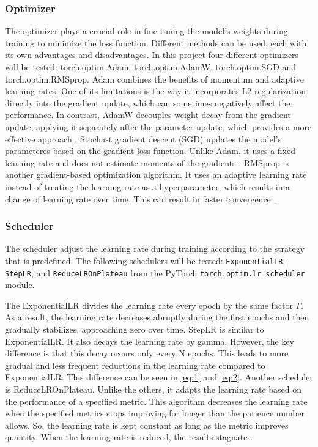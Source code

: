 \documentclass[twocolumn]{article}
\begin{document}
\subsubsection{Optimizer}
The optimizer plays a crucial role in fine-tuning the model's weights during training to minimize the loss function. 
Different methods can be used, each with its own advantages and disadvantages. 
In this project four different optimizers will be tested: torch.optim.Adam, torch.optim.AdamW, torch.optim.SGD and torch.optim.RMSprop. 
Adam combines the benefits of momentum and adaptive learning rates.  
One of its limitations is the way it incorporates L2 regularization directly into the gradient update, which can sometimes negatively affect the performance. 
In contrast, AdamW decouples weight decay from the gradient update, applying it separately after the parameter update, which provides a more effective approach \cite{pykes-2021}.
Stochast gradient descent (SGD) updates the model's parameteres based on the gradient loss function. 
Unlike Adam, it uses a fixed learning rate and does not estimate moments of the gradients \cite{massed-compute-2025}.
RMSprop is another gradient-based optimization algorithm. 
It uses an adaptive learning rate instead of treating the learning rate as a hyperparameter, which results in a change of learning rate over time. 
This can result in faster convergence \cite{sanghvirajit-2025}.

\subsubsection{Scheduler} \label{subsec:Scheduler}
The scheduler adjust the learning rate during training according to the strategy that is predefined. 
The following schedulers will be tested: \texttt{ExponentialLR}, \texttt{StepLR}, and \texttt{ReduceLROnPlateau} from the PyTorch \texttt{torch.optim.lr\_scheduler} module.

The ExponentialLR divides the learning rate every epoch by the same factor $\Gamma$. 
As a result, the learning rate decreases abruptly during the first epochs and then gradually stabilizes, approaching zero over time. 
StepLR is similar to ExponentialLR. It also decays the learning rate by gamma. However, the key difference is that this decay occurs only every N epochs. 
This leads to more gradual and less frequent reductions in the learning rate compared to ExponentialLR. 
This difference can be seen in \ref{eq:1} and \ref{eq:2}.
Another scheduler is ReduceLROnPlateau. Unlike the others, it adapts the learning rate based on the performance of a specified metric. 
This algorithm decreases the learning rate when the specified metrics stops improving for longer than the patience number allows. 
So, the learning rate is kept constant as long as the metric improves quantity. 
When the learning rate is reduced, the results stagnate \cite{unknown-author-no-date3} \cite{isbhargav-2020}. 
\end{document}
